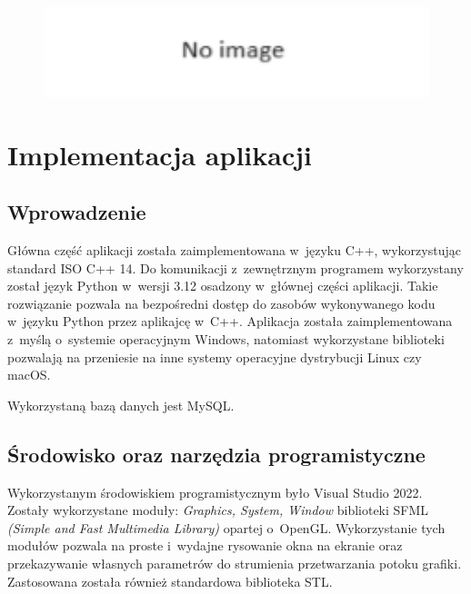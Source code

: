 \documentclass[12pt,a4paper]{article} %
\begin{document}
\begin{figure}[h]
	\centering
	\includegraphics[width=12cm]{images/no_image.png}
	\caption{}
	\label{rys:struktura_bazy_danych}
\end{figure} 

\clearpage
\section{Implementacja aplikacji}

\subsection{Wprowadzenie} %
\aka Główna część aplikacji została zaimplementowana w~języku C++, wykorzystując standard ISO C++ 14. 
Do komunikacji z~zewnętrznym programem wykorzystany został język Python w~wersji 3.12 osadzony w~głównej części aplikacji. Takie rozwiązanie pozwala na bezpośredni dostęp do zasobów wykonywanego kodu w~języku Python przez aplikajcę w~C++. 
Aplikacja została zaimplementowana z~myślą o~systemie operacyjnym Windows, natomiast wykorzystane biblioteki pozwalają na przeniesie na inne systemy operacyjne dystrybucji Linux czy macOS. %

Wykorzystaną bazą danych jest MySQL.


\subsection{Środowisko oraz narzędzia programistyczne}
\aka Wykorzystanym środowiskiem programistycznym było Visual Studio 2022. Zostały wykorzystane moduły: \textit{Graphics, System, Window} biblioteki SFML \textit{(Simple and Fast Multimedia Library)} opartej o~OpenGL. Wykorzystanie tych modułów pozwala na proste i~wydajne rysowanie okna na ekranie oraz przekazywanie własnych parametrów do strumienia przetwarzania potoku grafiki. Zastosowana została również standardowa biblioteka STL. 
\end{document}
